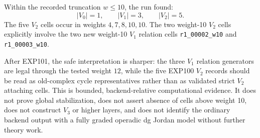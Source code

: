 \documentclass[11pt]{article}
\begin{document}
Within the recorded truncation \(w\leq 10\), the run found:
\[
|V_0|=1,\qquad |V_1|=3,\qquad |V_2|=5.
\]
The five \(V_2\) cells occur in weights \(4,7,8,10,10\).  The two weight-10
\(V_2\) cells explicitly involve the two new weight-10 \(V_1\) relation cells
\texttt{r1\_00002\_w10} and \texttt{r1\_00003\_w10}.

After EXP101, the safe interpretation is sharper: the three \(V_1\) relation
generators are legal through the tested weight \(12\), while the five EXP100
\(V_2\) records should be read as old-complex cycle representatives rather than
as validated strict \(V_2\) attaching cells.  This is bounded, backend-relative
computational evidence.  It does not prove global stabilization, does not
assert absence of cells above weight 10, does not construct \(V_3\) or higher
layers, and does not identify the ordinary backend output with a fully graded
operadic dg Jordan model without further theory work.
\end{document}
